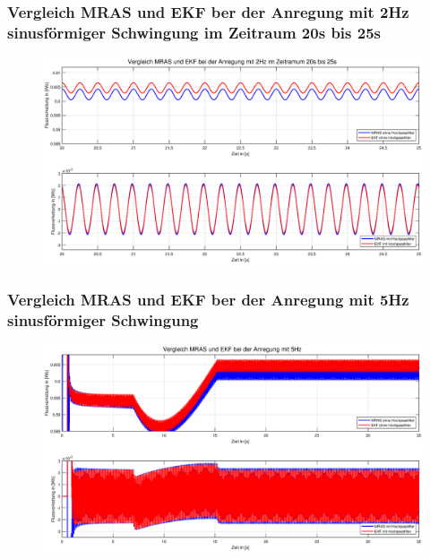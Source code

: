 \documentclass[serif,11pt, xcolor=table]{beamer}
\begin{document}
\begin{frame}
	\frametitle{Vergleich MRAS und EKF ber der Anregung mit 2Hz sinusförmiger Schwingung im Zeitraum 20s bis 25s }
	
	\begin{figure}[htbp]
		\centering
		\includegraphics[scale=0.30]{Abbildungen/Vergleich_2Hz_20s.eps}
		
	\end{figure}	
	
\end{frame}
\begin{frame}
	\frametitle{Vergleich MRAS und EKF ber der Anregung mit 5Hz sinusförmiger Schwingung }
	
	\begin{figure}[htbp]
		\centering
		\includegraphics[scale=0.30]{Abbildungen/Vergleich_5Hz.eps}
		
	\end{figure}	
	
\end{frame}
\end{document}
